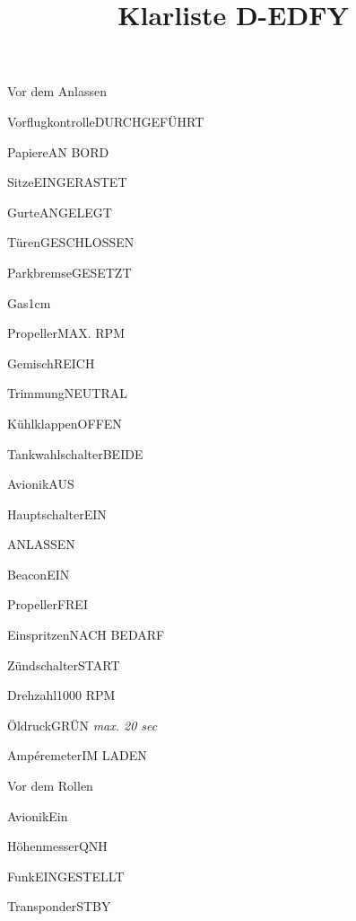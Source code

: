 \def\papersize{4}





\title{Klarliste D-EDFY}

\begin{memoryitem}
  \begin{checklist}{Vor dem Anlassen}
    \item{Vorflugkontrolle}{DURCHGEFÜHRT}
    \item{Papiere}{AN BORD}
    \item{Sitze}{EINGERASTET}
    \item{Gurte}{ANGELEGT}
    \item{Türen}{GESCHLOSSEN}
    \item{Parkbremse}{GESETZT}
    \item{Gas}{1cm}
    \item{Propeller}{MAX. RPM}
    \item{Gemisch}{REICH}
    \item{Trimmung}{NEUTRAL}
    \item{Kühlklappen}{OFFEN}
    \item{Tankwahlschalter}{BEIDE}
    \item{Avionik}{AUS}
    \item{Hauptschalter}{EIN}
  \end{checklist}
\end{memoryitem}

\begin{memoryitem}
  \begin{checklist}{ANLASSEN}
    \item{Beacon}{EIN}
    \item{Propeller}{FREI}
    \item{Einspritzen}{NACH BEDARF}
    \item{Zündschalter}{START}
    \item{Drehzahl}{1000 RPM}
    \item{Öldruck}{GRÜN \textit{max. 20 sec}}
    \item{Ampéremeter}{IM LADEN}
  \end{checklist}
\end{memoryitem}

\begin{memoryitem}
  \begin{checklist}{Vor dem Rollen}
    \item{Avionik}{Ein}
    \item{Höhenmesser}{QNH}
    \item{Funk}{EINGESTELLT}
    \item{Transponder}{STBY}
  \end{checklist}
\end{memoryitem}

